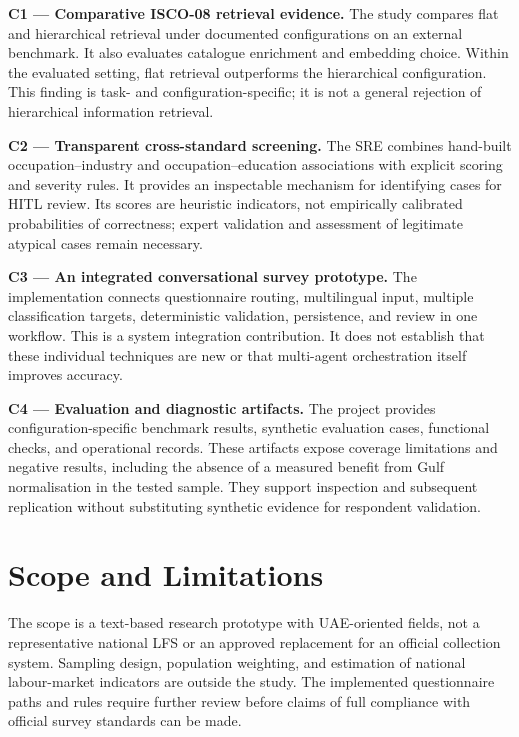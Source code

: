 \noindent\textbf{C1 --- Comparative ISCO-08 retrieval evidence.}
The study compares flat and hierarchical retrieval under documented
configurations on an external benchmark. It also evaluates catalogue
enrichment and embedding choice. Within the evaluated setting, flat
retrieval outperforms the hierarchical configuration. This finding is
task- and configuration-specific; it is not a general rejection of
hierarchical information retrieval.

\noindent\textbf{C2 --- Transparent cross-standard screening.}
The SRE combines hand-built occupation--industry and
occupation--education associations with explicit scoring and severity
rules. It provides an inspectable mechanism for identifying cases for
HITL review. Its scores are heuristic indicators, not empirically
calibrated probabilities of correctness; expert validation and assessment
of legitimate atypical cases remain necessary.

\noindent\textbf{C3 --- An integrated conversational survey prototype.}
The implementation connects questionnaire routing, multilingual input,
multiple classification targets, deterministic validation, persistence,
and review in one workflow. This is a system integration contribution.
It does not establish that these individual techniques are new or that
multi-agent orchestration itself improves accuracy.

\noindent\textbf{C4 --- Evaluation and diagnostic artifacts.}
The project provides configuration-specific benchmark results, synthetic
evaluation cases, functional checks, and operational records. These
artifacts expose coverage limitations and negative results, including the
absence of a measured benefit from Gulf normalisation in the tested
sample. They support inspection and subsequent replication without
substituting synthetic evidence for respondent validation.

\section{Scope and Limitations}
\label{sec:scope}

The scope is a text-based research prototype with UAE-oriented fields,
not a representative national LFS or an approved replacement for an
official collection system. Sampling design, population weighting, and
estimation of national labour-market indicators are outside the study.
The implemented questionnaire paths and rules require further review
before claims of full compliance with official survey standards can be
made.

